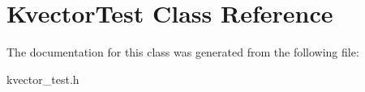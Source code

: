 \hypertarget{classKvectorTest}{\section{\-Kvector\-Test \-Class \-Reference}
\label{classKvectorTest}
}


\-The documentation for this class was generated from the following file\-:\begin{DoxyCompactItemize}
\item 
kvector\-\_\-test.\-h\end{DoxyCompactItemize}
